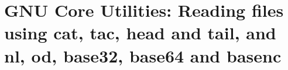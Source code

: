 
\chapter{GNU Core Utilities: Reading files using cat, tac, head and tail, and nl, od, base32, base64 and basenc}

